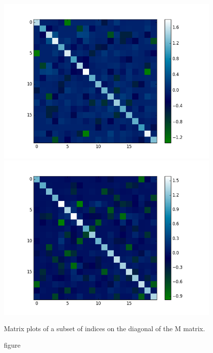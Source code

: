 \documentclass{article}
\begin{document}
	\begin{figure}[h]
		\centering
		\begin{minipage}{.35\textwidth}
			\centering
			\includegraphics[width=\linewidth]{imgs/mat_20_1.png}
		\end{minipage}
		\begin{minipage}{.35\textwidth}
			\centering
			\includegraphics[width=\linewidth]{imgs/mat_20_2.png}
		\end{minipage}
		\caption{figure}{Matrix plots of a subset of indices on the diagonal of the M matrix.}
	\end{figure}
	
\end{document}
